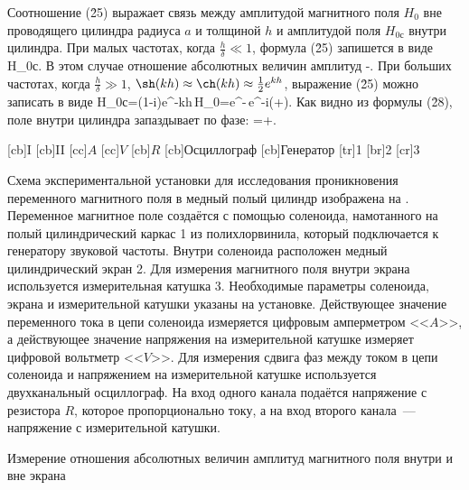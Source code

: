 Соотношение (\r{25}) выражает связь между амплитудой магнитного поля $H_0$ вне проводящего цилиндра радиуса $a$ и
толщиной $h$ и амплитудой поля $H_{0с}$ внутри цилиндра. При малых частотах, когда $\frac{h}{\delta}\ll 1$, формула
(\r{25}) запишется в виде
H_{0с}\approx{}.
\ee
В этом случае отношение абсолютных величин амплитуд
-.
\ee
При больших частотах, когда $\frac{h}{\delta}\gg 1$, $\sh(kh)\approx\ch(kh)\approx\frac12e^{kh}$, выражение (\r{25})
можно записать в виде
H_{0с}=(1-i)e^{-kh}\,H_0=e^{-}\,e^{-i(+)}.
\ee
Как видно из формулы (\r{28}), поле внутри цилиндра запаздывает по фазе:
\D\psi=+.
\ee

{
[cb]{I}
[cb]{II}
[cc]{$A$}
[cc]{$V$}
[cb]{$R$}
[cb]{Осциллограф}
[cb]{Генератор}
[tr]{1}
[br]{2}
[cr]{3}
}

\eo Схема экспериментальной установки для исследования проникновения переменного магнитного поля в медный полый цилиндр
изображена на . Переменное магнитное поле создаётся с помощью соленоида, намотанного на полый цилиндрический каркас 1
из полихлорвинила, который подключается к генератору звуковой частоты. Внутри соленоида расположен медный цилиндрический
экран 2. Для измерения магнитного поля внутри экрана используется измерительная катушка 3. Необходимые параметры
соленоида, экрана и измерительной катушки указаны на установке. Действующее значение переменного тока в цепи соленоида
измеряется цифровым амперметром <<$A$>>, а действующее значение напряжения на измерительной катушке измеряет цифровой
вольтметр <<$V$>>. Для измерения сдвига фаз между током в цепи соленоида и напряжением на измерительной катушке
используется двухканальный осциллограф. На вход одного канала подаётся напряжение с резистора $R$, которое
пропорционально току, а на вход второго канала~--- напряжение с измерительной катушки.

\vn Измерение отношения абсолютных величин амплитуд магнитного поля внутри и вне экрана


